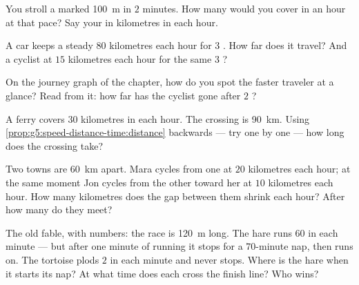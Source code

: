\begin{exercise}[$\star$]\label{exo:g5:speed-distance-time:6}
You stroll a marked \qty{100}{m} in $2$ minutes. How many 
would you cover in an hour at that pace? Say your  in
kilometres in each hour.
\end{exercise}

\begin{exercise}[$\star$]\label{exo:g5:speed-distance-time:7}
A car keeps a steady $80$ kilometres each hour for $3$ . How
far does it travel? And a cyclist at $15$ kilometres each hour for
the same $3$ ?
\end{exercise}

\begin{exercise}[$\star$]\label{exo:g5:speed-distance-time:8}
On the journey graph of the chapter, how do you spot the faster
traveler at a glance? Read from it: how far has the cyclist gone
after $2$ ?
\end{exercise}

\begin{exercise}[$\star\star$]\label{exo:g5:speed-distance-time:9}
A ferry covers $30$ kilometres in each hour. The crossing is
\qty{90}{km}. Using
\cref{prop:g5:speed-distance-time:distance} backwards --- try
 one by one --- how long does the crossing take?
\end{exercise}

\begin{exercise}[$\star\star$]\label{exo:g5:speed-distance-time:10}
Two towns are \qty{60}{km} apart. Mara cycles from one at $20$
kilometres each hour; at the same moment Jon cycles from the other
toward her at $10$ kilometres each hour. How many kilometres does
the gap between them shrink each hour? After how many  do they
meet?
\end{exercise}

\begin{exercise}[$\star\star$]\label{exo:g5:speed-distance-time:11}
The old fable, with numbers: the race is \qty{120}{m} long. The
hare runs $60$  in each minute --- but after one minute of
running it stops for a $70$-minute nap, then runs on. The tortoise
plods $2$  in each minute and never stops. Where is the hare
when it starts its nap? At what time does each cross the finish
line? Who wins?
\end{exercise}
